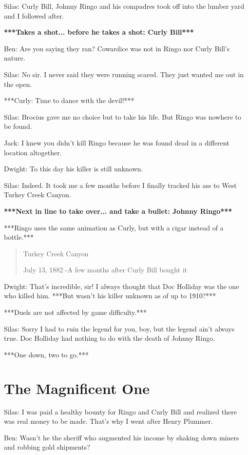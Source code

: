 \documentclass{article}
\begin{document}
Silas: Curly Bill, Johnny Ringo and his compadres took off into the lumber yard and I followed after.

\textbf{***Takes a shot... before he takes a shot: Curly Bill***}

Ben: Are you saying they ran? Cowardice was not in Ringo nor Curly Bill's nature.

Silas: No sir. I never said they were running scared. They just wanted me out in the open.

***Curly: Time to dance with the devil!***

Silas: Brocius gave me no choice but to take his life. But Ringo was nowhere to be found.

Jack: I knew you didn't kill Ringo because he was found dead in a different location altogether.

Dwight: To this day his killer is still unknown.

Silas: Indeed. It took me a few months before I finally tracked his ass to West Turkey Creek Canyon.

\textbf{***Next in line to take over... and take a bullet: Johnny Ringo***}

***Ringo uses the same animation as Curly, but with a cigar instead of a bottle.***

\begin{quote}
    Turkey Creek Canyon
    
    July 13, 1882 -A few months after Curly Bill bought it
\end{quote}

Dwight: That's incredible, sir! I always thought that Doc Holliday was the one who killed him. ***But wasn't his killer unknown as of up to 1910?***

***Duels are not affected by game difficulty.***

Silas: Sorry I had to ruin the legend for you, boy, but the legend ain't always true. Doc Holliday had nothing to do with the death of Johnny Ringo.

***One down, two to go.***

\section*{The Magnificent One}

Silas: I was paid a healthy bounty for Ringo and Curly Bill and realized there was real money to be made. That's why I went after Henry Plummer.

Ben: Wasn't he the sheriff who augmented his income by shaking down miners and robbing gold shipments?
\end{document}
